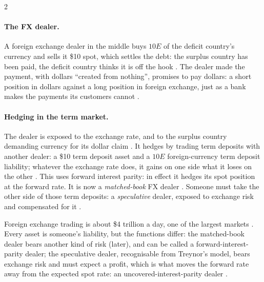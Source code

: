 \begin{paracol}{2}
\paragraph{The FX dealer.} A foreign exchange dealer in the middle buys $10E$ of the deficit country's currency and sells it \$10 spot, which settles the debt: the surplus
country has been paid, the deficit country thinks it is off the hook . The dealer made the
payment, with dollars ``created from nothing'', promises to pay dollars: a short position in dollars against a long position in foreign exchange, just as a bank makes the
payments its customers cannot .

\paragraph{Hedging in the term market.} The dealer is exposed to the exchange rate, and to the surplus country demanding currency for its dollar claim . It hedges by
trading term deposits with another dealer: a \$10 term deposit asset and a $10E$ foreign-currency term deposit liability; whatever the exchange rate does, it gains on one side
what it loses on the other . This uses forward interest parity: in effect it hedges its spot position at the forward rate. It is now a
\emph{matched-book} FX dealer . Someone must take the other side of those term deposits: a \emph{speculative} dealer, exposed to exchange risk and
compensated for it .
\begin{taccts}
\quad
{}\quad
{}

\medskip
{}
\end{taccts}
Foreign exchange trading is about \$4 trillion a day, one of the largest markets . Every asset is someone's liability, but the functions differ: the matched-book dealer
bears another kind of risk (later), and can be called a forward-interest-parity dealer; the speculative dealer, recognisable from Treynor's model, bears exchange risk and must expect a
profit, which is what moves the forward rate away from the expected spot rate: an uncovered-interest-parity dealer .


\end{paracol}
